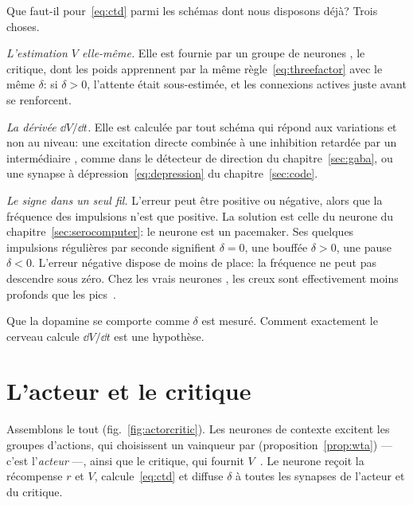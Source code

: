 Que faut-il pour~\eqref{eq:ctd} parmi les schémas dont nous disposons déjà? Trois choses.

\emph{L'estimation $V$ elle-même.} Elle est fournie par un groupe de neurones , le critique, dont les poids apprennent par la même règle~\eqref{eq:threefactor} avec le même $\delta$: si $\delta>0$, l'attente était sous-estimée, et les connexions actives juste avant se renforcent.

\emph{La dérivée $\dd V/\dd t$.} Elle est calculée par tout schéma qui répond aux variations et non au niveau: une excitation directe combinée à une inhibition retardée par un intermédiaire , comme dans le détecteur de direction du chapitre~\ref{sec:gaba}, ou une synapse à dépression~\eqref{eq:depression} du chapitre~\ref{sec:code}.

\emph{Le signe dans un seul fil.} L'erreur peut être positive ou négative, alors que la fréquence des impulsions n'est que positive. La solution est celle du neurone  du chapitre~\ref{sec:serocomputer}: le neurone  est un pacemaker. Ses quelques impulsions régulières par seconde signifient $\delta=0$, une bouffée $\delta>0$, une pause $\delta<0$. L'erreur négative dispose de moins de place: la fréquence ne peut pas descendre sous zéro. Chez les vrais neurones , les creux sont effectivement moins profonds que les pics~\cite{Bayer2005}.

Que la dopamine se comporte comme $\delta$ est mesuré. Comment exactement le cerveau calcule $\dd V/\dd t$ est une hypothèse.

\section{L'acteur et le critique}

Assemblons le tout (fig.~\ref{fig:actorcritic}). Les neurones de contexte excitent les groupes d'actions, qui choisissent un vainqueur par  (proposition~\ref{prop:wta}) --- c'est l'\emph{acteur} ---, ainsi que le critique, qui fournit $V$~\cite{SuttonBarto2018}. Le neurone  reçoit la récompense $r$ et $V$, calcule~\eqref{eq:ctd} et diffuse $\delta$ à toutes les synapses de l'acteur et du critique.

